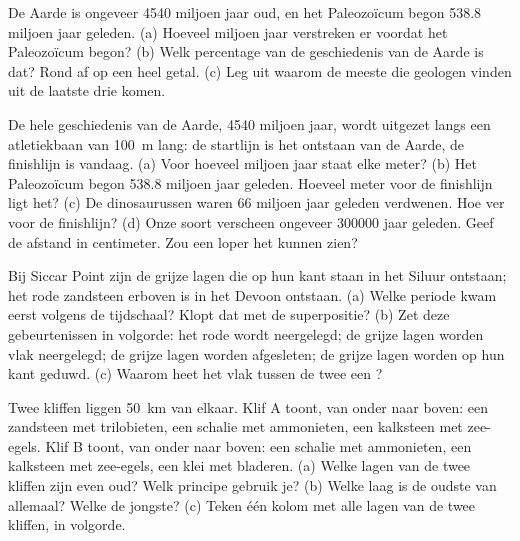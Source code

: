 \begin{exercise}[$\star\star$]\label{exo:g7:geological-time:7}
De Aarde is ongeveer \num{4540} miljoen jaar oud, en het Paleozoïcum begon
\num{538.8} miljoen jaar geleden. (a) Hoeveel miljoen jaar verstreken er
voordat het Paleozoïcum begon? (b) Welk percentage van de geschiedenis van
de Aarde is dat? Rond af op een heel getal. (c) Leg uit waarom de meeste
 die geologen vinden uit de laatste drie  komen.
\end{exercise}

\begin{exercise}[$\star\star$]\label{exo:g7:geological-time:8}
De hele geschiedenis van de Aarde, \num{4540} miljoen jaar, wordt uitgezet
langs een atletiekbaan van \qty{100}{m} lang: de startlijn is het ontstaan
van de Aarde, de finishlijn is vandaag. (a) Voor hoeveel miljoen jaar staat
elke meter? (b) Het Paleozoïcum begon \num{538.8} miljoen jaar geleden.
Hoeveel meter voor de finishlijn ligt het? (c) De dinosaurussen waren
\num{66} miljoen jaar geleden verdwenen. Hoe ver voor de finishlijn?
(d) Onze soort verscheen ongeveer \num{300000} jaar geleden. Geef de
afstand in centimeter. Zou een loper het kunnen zien?
\end{exercise}

\begin{exercise}[$\star\star$]\label{exo:g7:geological-time:9}
Bij Siccar Point zijn de grijze lagen die op hun kant staan in het Siluur
ontstaan; het rode zandsteen erboven is in het Devoon ontstaan. (a) Welke
periode kwam eerst volgens de tijdschaal? Klopt dat met de superpositie?
(b) Zet deze gebeurtenissen in volgorde: het rode  wordt neergelegd; de
grijze lagen worden vlak neergelegd; de grijze lagen worden afgesleten; de
grijze lagen worden op hun kant geduwd. (c) Waarom heet het vlak tussen de
twee  een ?
\end{exercise}

\begin{exercise}[$\star\star$]\label{exo:g7:geological-time:10}
Twee kliffen liggen \qty{50}{km} van elkaar. Klif A toont, van onder naar
boven: een zandsteen met trilobieten, een schalie met ammonieten, een
kalksteen met zee-egels. Klif B toont, van onder naar boven: een schalie met
ammonieten, een kalksteen met zee-egels, een klei met bladeren. (a) Welke
lagen van de twee kliffen zijn even oud? Welk principe gebruik je? (b) Welke
laag is de oudste van allemaal? Welke de jongste? (c) Teken één kolom met
alle lagen van de twee kliffen, in volgorde.
\end{exercise}

